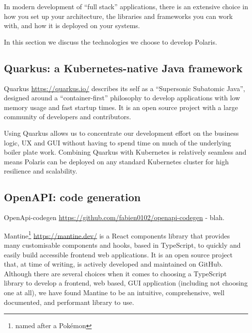 \documentclass[11pt,twoside]{article}
\begin{document}
In modern development of ``full stack'' applications, there is an extensive choice in how you set up your
architecture, the libraries and frameworks you can work with, and how it is deployed on your systems.

In this section we discuss the technologies we choose to develop Polaris.

\subsection{Quarkus: a Kubernetes-native Java framework}\label{subsec:quarkus}

Quarkus \url{https://quarkus.io/} describes its self as a ``Supersonic Subatomic Java'', designed around a
``container-first'' philosophy to develop applications with low memory usage and fast startup times.
It is an open source project with a large community of developers and contributors.

Using Quarkus allows us to concentrate our development effort on the business logic, UX and GUI without 
having to spend time on much of the underlying boiler plate work.  Combining Quarkus with Kubernetes is 
relatively seamless and means Polaris can be deployed on any standard Kubernetes cluster for high 
resilience and scalability. 

\subsection{OpenAPI: code generation}\label{subsec:openapi-code-generation}

OpenApi-codegen \url{https://github.com/fabien0102/openapi-codegen}  - blah.


Mantine\footnote{named after a Pok\'emon} \url{https://mantine.dev/} is a React components library that
provides many customisable components and hooks, based in TypeScript, to quickly and easily build accessible
frontend web applications.
It is an open source project that, at time of writing, is actively developed and maintained on GitHub.
Although there are several choices when it comes to choosing a TypeScript library to develop a frontend,
web based, GUI application (including not choosing one at all), we have found Mantine to be an intuitive,
comprehensive, well documented, and performant library to use.
\end{document}
